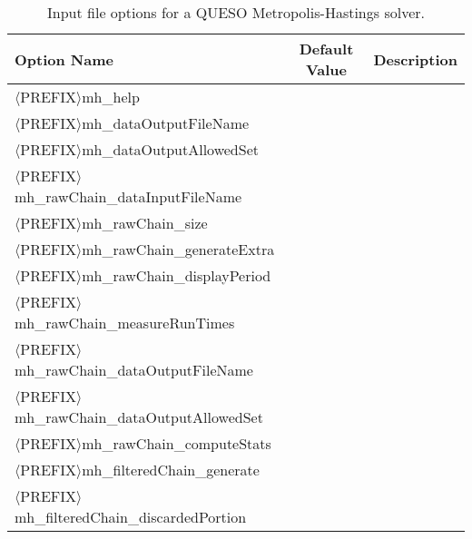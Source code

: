 \begin{table}[htpb]
\begin{center}
\caption{Input file options for a QUESO Metropolis-Hastings solver.}
\ttfamily
\begin{tabular}{l|c|c}
\toprule
\rmfamily Option Name                                    & \rmfamily Default Value& \rmfamily Description \\
\midrule\midrule
$\langle$PREFIX$\rangle$mh\_help                                &         &             \\

$\langle$PREFIX$\rangle$mh\_dataOutputFileName                  &         &             \\

$\langle$PREFIX$\rangle$mh\_dataOutputAllowedSet                &         &             \\

$\langle$PREFIX$\rangle$mh\_rawChain\_dataInputFileName         &         &             \\

$\langle$PREFIX$\rangle$mh\_rawChain\_size                      &         &             \\

$\langle$PREFIX$\rangle$mh\_rawChain\_generateExtra             &         &             \\

$\langle$PREFIX$\rangle$mh\_rawChain\_displayPeriod             &         &             \\

$\langle$PREFIX$\rangle$mh\_rawChain\_measureRunTimes           &         &             \\

$\langle$PREFIX$\rangle$mh\_rawChain\_dataOutputFileName        &         &             \\

$\langle$PREFIX$\rangle$mh\_rawChain\_dataOutputAllowedSet      &         &             \\

$\langle$PREFIX$\rangle$mh\_rawChain\_computeStats              &         &             \\

$\langle$PREFIX$\rangle$mh\_filteredChain\_generate             &         &             \\

$\langle$PREFIX$\rangle$mh\_filteredChain\_discardedPortion     &         &             \\


\end{tabular}
\end{center}
\end{table}
